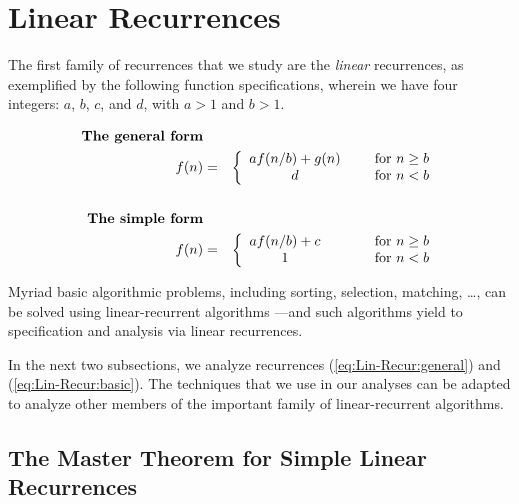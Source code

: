 \section{Linear Recurrences}
\label{sec:linear-recurrences}

The first family of recurrences that we study are the {\em linear} recurrences, as exemplified by the following function specifications, wherein we have four integers: $a$, $b$, $c$, and $d$, with $a>1$ and $b>1$.

\begin{eqnarray}
\nonumber
\mbox{\bf The general form} & & \\
\label{eq:Lin-Recur:general}
f(n) & = & \left\{
\begin{array}{cl}
a f(n/b) + g(n) & \hspace*{.2in} \mbox{for } n \geq b \\
                    d & \hspace*{.2in} \mbox{for } n < b
\end{array}
\right. \\
\nonumber
  & & \\
\nonumber
\mbox{\bf The simple form} & & \\
\label{eq:Lin-Recur:basic}
f(n) & = & \left\{
\begin{array}{cl}
a f(n/b) + c & \hspace*{.4in} \mbox{for } n \geq b \\
               1 & \hspace*{.4in} \mbox{for } n < b
\end{array}
\right.
\end{eqnarray}


\smallskip

Myriad basic algorithmic problems, including sorting, selection, matching, \ldots, can be solved using linear-recurrent algorithms \cite{CLRS}---and such algorithms yield to specification and analysis via linear recurrences.

\smallskip

In the next two subsections, we analyze recurrences (\ref{eq:Lin-Recur:general}) and (\ref{eq:Lin-Recur:basic}).  The techniques that we use in our analyses can be adapted to analyze other members of the important family of linear-recurrent algorithms.


\subsection{The Master Theorem for Simple Linear Recurrences} 
\label{sec:masterTheorem}
\label{sec:linear-recurrence-basic}

